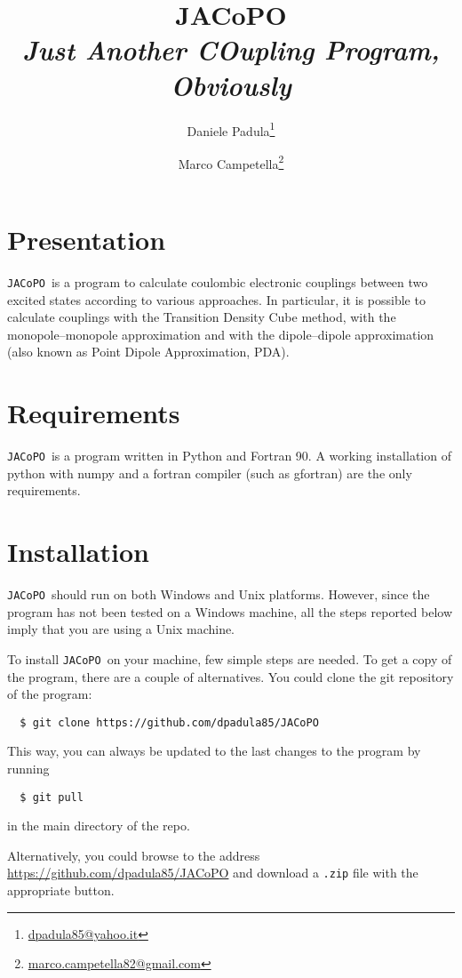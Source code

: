 \documentclass[a4paper]{article}
\title{JACoPO \\ \textit{Just Another COupling Program, Obviously}}
\author[1]{Daniele Padula\thanks{\href{mailto:dpadula85@yahoo.it}{dpadula85@yahoo.it}}}
\author[1]{Marco Campetella\thanks{\href{mailto:marco.campetella82@gmail.com}{marco.campetella82@gmail.com}}}
\affil[1]{\textit{Dipartimento di Chimica e Chimica Industriale, Universit\`a di Pisa, via G.~Moruzzi 13, 56124 Pisa, Italy}}
\newcommand{\jacopo}{\texttt{JACoPO}}
\begin{document}
\maketitle

\section*{Presentation}

\jacopo\ is a program to calculate coulombic electronic couplings between two excited states according to various approaches.
In particular, it is possible to calculate couplings with the Transition Density Cube method, with the monopole--monopole approximation
and with the dipole--dipole approximation (also known as Point Dipole Approximation, PDA).

\section*{Requirements}

\jacopo\ is a program written in Python and Fortran 90. A working installation of python with numpy and a fortran compiler (such as gfortran) are the only requirements.

\section*{Installation}

\jacopo\ should run on both Windows and Unix platforms. However, since the program has not been tested on a Windows machine,
all the steps reported below imply that you are using a Unix machine.

To install \jacopo\ on your machine, few simple steps are needed.
To get a copy of the program, there are a couple of alternatives.
You could clone the git repository of the program:

\begin{verbatim}
  $ git clone https://github.com/dpadula85/JACoPO 
\end{verbatim}

This way, you can always be updated to the last changes to the program by running

\begin{verbatim}
  $ git pull 
\end{verbatim}

in the main directory of the repo.

Alternatively, you could browse to the address \url{https://github.com/dpadula85/JACoPO} and download a \verb|.zip| file with the appropriate button.
\end{document}
